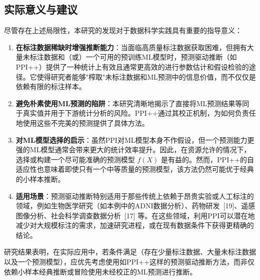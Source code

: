 \documentclass[12pt,a4paper]{article}
\begin{document}
\subsection{实际意义与建议}
\label{sec:practical_significance}
尽管存在上述局限性，本研究的发现对于数据科学实践具有重要的指导意义：
\begin{enumerate}
    \item \textbf{在标注数据稀缺时增强推断能力}：当面临高质量标注数据获取困难，但拥有大量未标注数据和（或）一个可用的预训练ML模型时，预测驱动推断（如PPI++）提供了一种统计上有效且通常更高效的进行参数估计和假设检验的途径。它使得研究者能够"榨取"未标注数据和ML预测中的信息价值，而不仅仅是依赖有限的标注样本。
    \item \textbf{避免朴素使用ML预测的陷阱}：本研究清晰地揭示了直接将ML预测结果等同于真实值并用于下游统计分析的风险。PPI++通过其校正机制，为如何负责任地使用这些不完美的预测提供了具体方法。
    \item \textbf{对ML模型选择的启示}：虽然PPI对ML模型本身不作假设，但一个预测能力更强的ML模型通常会带来更大的统计效率提升。因此，在资源允许的情况下，选择或构建一个尽可能准确的预测模型 $f(X)$ 是有益的。然而，PPI++的自适应性也意味着即使只有一个中等质量的预测模型，该方法仍然可能优于经典的小样本推断。
    \item \textbf{适用场景}：预测驱动推断特别适用于那些传统上依赖于昂贵实验或人工标注的领域，例如生物医学研究（如本例中的ADNI数据分析）、药物研发~{[19]}、遥感图像分析、社会科学调查数据分析~{[17]} 等。在这些领域，利用PPI可以潜在地减少对大规模标注的需求，加速研究进程，或在现有数据条件下获得更精确的结论。
\end{enumerate}
研究结果表明，在实际应用中，若条件满足（存在少量标注数据、大量未标注数据以及一个预测模型），应优先考虑使用如PPI++这样的预测驱动推断方法，而非仅依赖小样本经典推断或冒险使用未经校正的ML预测进行推断。
\end{document}
